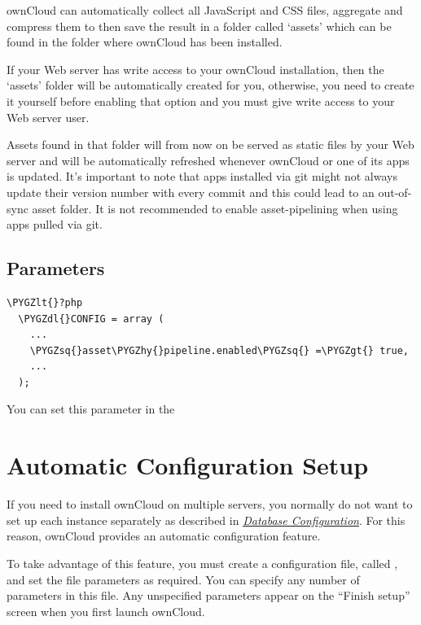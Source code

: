 \documentclass[letterpaper,10pt,english]{sphinxmanual}
\def\PYGZlt{\char`\<}
\def\PYGZgt{\char`\>}
\def\PYGZdl{\char`\$}
\def\PYGZhy{\char`\-}
\def\PYGZsq{\char`\'}
\begin{document}
ownCloud can automatically collect all JavaScript and CSS files, aggregate and compress them to then save the result in a folder called `assets' which can be found in the folder where ownCloud has been installed.

If your Web server has write access to your ownCloud installation, then the `assets' folder will be automatically created for you, otherwise, you need to create it yourself before enabling that option and you must give write access to your Web server user.

Assets found in that folder will from now on be served as static files by your Web server and will be automatically refreshed whenever ownCloud or one of its apps is updated.
It's important to note that apps installed via git might not always update their version number with every commit and this could lead to an out-of-sync asset folder.
It is not recommended to enable asset-pipelining when using apps pulled via git.


\subsection{Parameters}
\label{configuration_server/js_css_asset_management_configuration:parameters}
\begin{Verbatim}[commandchars=\\\{\}]
\PYGZlt{}?php
  \PYGZdl{}CONFIG = array (
    ...
    \PYGZsq{}asset\PYGZhy{}pipeline.enabled\PYGZsq{} =\PYGZgt{} true,
    ...
  );
\end{Verbatim}

You can set this parameter in the 


\section{Automatic Configuration Setup}
\label{configuration_server/automatic_configuration:automatic-configuration-setup}\label{configuration_server/automatic_configuration::doc}
If you need to install ownCloud on multiple servers, you normally do not want
to set up each instance separately as described in
{\hyperref[configuration_database/linux_database_configuration::doc]{\emph{Database Configuration}}}.
For this reason, ownCloud provides an automatic configuration feature.

To take advantage of this feature, you must create a configuration file, called
, and set the file parameters as required.
You can specify any number of parameters in this file.  Any unspecified parameters appear on the ``Finish setup'' screen when you first launch ownCloud.
\end{document}
